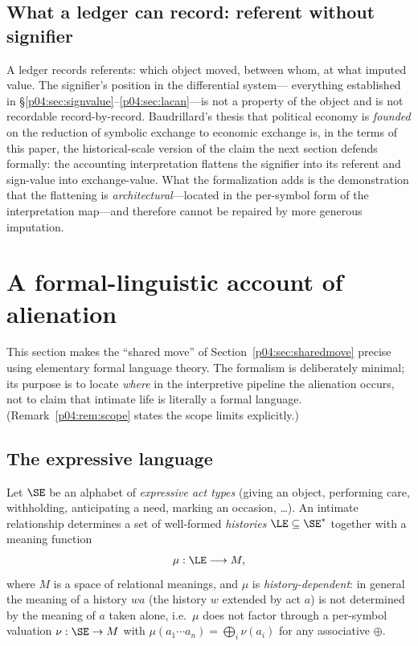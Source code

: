 \subsection{What a ledger can record: referent without signifier}
\label{p04:sec:referent}
A ledger records referents: which object moved, between whom, at what
imputed value. The signifier's position in the differential system---
everything established in \S\ref{p04:sec:signvalue}--\ref{p04:sec:lacan}---is not a
property of the object and is not recordable record-by-record.
Baudrillard's thesis that political economy is \emph{founded} on the
reduction of symbolic exchange to economic exchange
\parencite{baudrillard1981} is, in the terms of this paper, the historical-scale
version of the claim the next section defends formally: the accounting
interpretation flattens the signifier into its referent and sign-value into
exchange-value. What the formalization adds is the demonstration that the
flattening is \emph{architectural}---located in the per-symbol form of the
interpretation map---and therefore cannot be repaired by more generous
imputation.

\section{A formal-linguistic account of alienation}
\label{p04:sec:formal}

This section makes the ``shared move'' of Section~\ref{p04:sec:sharedmove}
precise using elementary formal language theory. The formalism is deliberately
minimal; its purpose is to locate \emph{where} in the interpretive pipeline
the alienation occurs, not to claim that intimate life is literally a formal
language. (Remark~\ref{p04:rem:scope} states the scope limits explicitly.)

\subsection{The expressive language}
\begin{definition}
\label{p04:def:expressive}
Let $\SE$ be an alphabet of \emph{expressive act types} (giving an object,
performing care, withholding, anticipating a need, marking an occasion,
\ldots). An intimate relationship determines a set of well-formed
\emph{histories} $\LE \subseteq \SE^{*}$ together with a meaning function
\[
\mu : \LE \longrightarrow M,
\]
where $M$ is a space of relational meanings, and $\mu$ is
\emph{history-dependent}: in general the meaning of a history $wa$ (the
history $w$ extended by act $a$) is not determined by the meaning of $a$
taken alone, i.e.\ $\mu$ does not factor through a per-symbol valuation
$\nu:\SE \to M$ with $\mu(a_1\cdots a_n) = \bigoplus_i \nu(a_i)$ for any
associative $\oplus$.
\end{definition}

